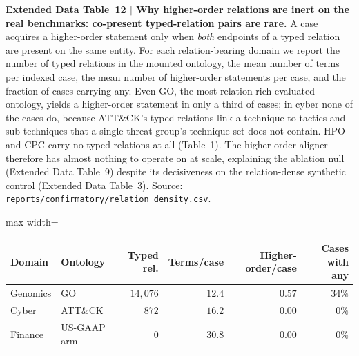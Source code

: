 \documentclass[pdflatex,sn-nature]{sn-jnl}
\newcommand{\edcaption}[1]{\par{\small #1}\par\smallskip}
\begin{document}
\begin{appendices}
\begin{table}[htbp]
\centering
\edcaption{\textbf{Extended Data Table~12 $|$ Why higher-order relations are inert
    on the real benchmarks: co-present typed-relation pairs are rare.}
  A case acquires a higher-order statement only when \emph{both} endpoints of a
  typed relation are present on the same entity. For each relation-bearing domain
  we report the number of typed relations in the mounted ontology, the mean number
  of terms per indexed case, the mean number of higher-order statements per case,
  and the fraction of cases carrying any. Even GO, the most relation-rich evaluated
  ontology, yields a higher-order statement in only a third of cases; in cyber none
  of the cases do, because ATT\&CK's typed relations link a technique to tactics
  and sub-techniques that a single threat group's technique set does not contain.
  HPO and CPC carry no typed relations at all (Table~1). The higher-order aligner
  therefore has almost nothing to operate on at scale, explaining the ablation null
  (Extended Data Table~9) despite its decisiveness on the relation-dense synthetic
  control (Extended Data Table~3).
  Source: \texttt{reports/confirmatory/relation\_density.csv}.}
\small
\setlength{\tabcolsep}{6pt}
\begin{adjustbox}{max width=\textwidth}
\begin{tabular}{llrrrr}
\toprule
\textbf{Domain} & \textbf{Ontology} & \textbf{Typed rel.} & \textbf{Terms/case} &
    \textbf{Higher-order/case} & \textbf{Cases with any} \\
\midrule
Genomics & GO            & $14{,}076$ & $12.4$ & $0.57$ & $34\%$ \\
Cyber    & ATT\&CK       & $872$      & $16.2$ & $0.00$ & $0\%$ \\
Finance  & US-GAAP arm   & $0$        & $30.8$ & $0.00$ & $0\%$ \\
\bottomrule
\end{tabular}
\end{adjustbox}
\label{tab:ed12_relation_density}
\end{table}




\end{appendices}
\end{document}
